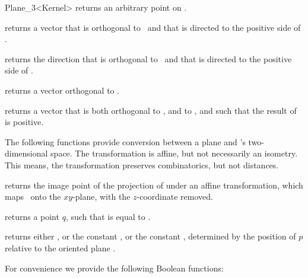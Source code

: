 \begin{ccRefClass} {Plane_3<Kernel>}
       {returns an arbitrary point on \ccVar.}

       {returns a vector that is orthogonal to \ccVar\ and that
        is directed to the positive side of \ccVar.}

       {returns the direction that is orthogonal to \ccVar\ and that
        is directed to the positive side of \ccVar.}

       {returns a vector orthogonal to 
        .}

       {returns a vector that is both orthogonal to ,
        and to , and such that the result of 
         is positive.}


The following functions provide conversion between a plane and 
\cgal's two-dimensional space. The transformation is affine, but
not necessarily an isometry. This means, the transformation preserves
combinatorics, but not distances.

       {returns the image point of the projection of  
       under an affine transformation, which maps \ccVar\ onto the 
       $xy$-plane, with the $z$-coordinate removed.}

       {returns a point $q$, such that 
        is equal to .}

\ccPredicates

       {returns either , or
        the constant , or the constant
        , 
        determined by the position of $p$ relative to the oriented plane \ccVar.
        }

For convenience we provide the following Boolean functions:

       {}
\ccGlue
{}
       {}
\ccGlue
{}
       {}


\end{ccRefClass}
